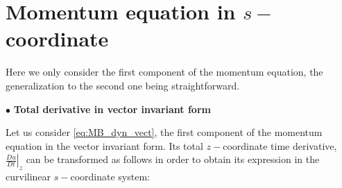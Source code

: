 \documentclass[../main/NEMO_manual]{subfiles}
\begin{document}
\section{Momentum equation in $s-$coordinate}
\label{sec:SCOORD_momentum}

Here we only consider the first component of the momentum equation,
the generalization to the second one being straightforward.

$\bullet$ \textbf{Total derivative in vector invariant form}

Let us consider \autoref{eq:MB_dyn_vect}, the first component of the momentum equation in the vector invariant form.
Its total $z-$coordinate time derivative,
$\left. \frac{D u}{D t} \right|_z$ can be transformed as follows in order to obtain
its expression in the curvilinear $s-$coordinate system:
\end{document}
